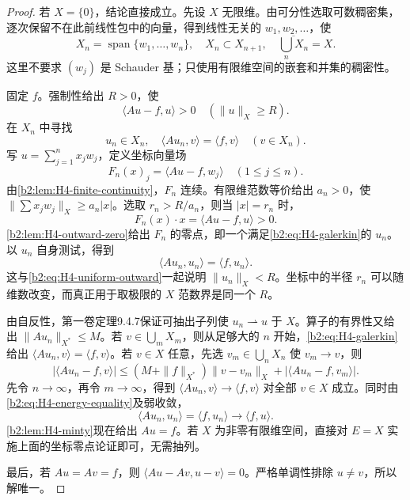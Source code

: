 \begin{proof}
若 \(X=\{0\}\)，结论直接成立。先设 \(X\) 无限维。由可分性选取可数稠密集，逐次保留不在此前线性包中的向量，得到线性无关的 \(w_1,w_2,\ldots\)，使
\[
 X_n=\operatorname{span}\{w_1,\ldots,w_n\},
 \quad X_n\subset X_{n+1},
 \quad\overline{\bigcup_nX_n}=X.
\]
这里不要求 \((w_j)\) 是 Schauder 基；只使用有限维空间的嵌套和并集的稠密性。

固定 \(f\)。强制性给出 \(R>0\)，使
\begin{equation}\label{b2:eq:H4-uniform-outward}
 \langle Au-f,u\rangle>0\quad(\|u\|_X\ge R).
\end{equation}
在 \(X_n\) 中寻找
\begin{equation}\label{b2:eq:H4-galerkin}
 u_n\in X_n,\quad
 \langle Au_n,v\rangle=\langle f,v\rangle
 \quad(v\in X_n).
\end{equation}
写 \(u=\sum_{j=1}^nx_jw_j\)，定义坐标向量场
\[
 F_n(x)_j=\langle Au-f,w_j\rangle\quad(1\le j\le n).
\]
由\cref{b2:lem:H4-finite-continuity}，\(F_n\) 连续。有限维范数等价给出 \(a_n>0\)，使 \(\|\sum x_jw_j\|_X\ge a_n|x|\)。选取 \(r_n>R/a_n\)，则当 \(|x|=r_n\) 时，
\[
 F_n(x)\cdot x=\langle Au-f,u\rangle>0.
\]
\cref{b2:lem:H4-outward-zero}给出 \(F_n\) 的零点，即一个满足\eqref{b2:eq:H4-galerkin}的 \(u_n\)。以 \(u_n\) 自身测试，得到
\begin{equation}\label{b2:eq:H4-energy-equality}
 \langle Au_n,u_n\rangle=\langle f,u_n\rangle.
\end{equation}
这与\eqref{b2:eq:H4-uniform-outward}一起说明 \(\|u_n\|_X<R\)。坐标中的半径 \(r_n\) 可以随维数改变，而真正用于取极限的 \(X\) 范数界是同一个 \(R\)。

由自反性，第一卷定理9.4.7保证可抽出子列使 \(u_n\rightharpoonup u\) 于 \(X\)。算子的有界性又给出 \(\|Au_n\|_{X^*}\le M\)。若 \(v\in\bigcup_mX_m\)，则从足够大的 \(n\) 开始，\eqref{b2:eq:H4-galerkin}给出 \(\langle Au_n,v\rangle=\langle f,v\rangle\)。若 \(v\in X\) 任意，先选 \(v_m\in\bigcup_nX_n\) 使 \(v_m\to v\)，则
\[
 |\langle Au_n-f,v\rangle|
 \le(M+\|f\|_{X^*})\|v-v_m\|_X
        +|\langle Au_n-f,v_m\rangle|.
\]
先令 \(n\to\infty\)，再令 \(m\to\infty\)，得到
\(\langle Au_n,v\rangle\to\langle f,v\rangle\) 对全部 \(v\in X\) 成立。同时由\eqref{b2:eq:H4-energy-equality}及弱收敛，
\[
 \langle Au_n,u_n\rangle=\langle f,u_n\rangle
              \longrightarrow\langle f,u\rangle.
\]
\cref{b2:lem:H4-minty}现在给出 \(Au=f\)。若 \(X\) 为非零有限维空间，直接对 \(E=X\) 实施上面的坐标零点论证即可，无需抽列。

最后，若 \(Au=Av=f\)，则
\(\langle Au-Av,u-v\rangle=0\)。严格单调性排除 \(u\ne v\)，所以解唯一。
\end{proof}

